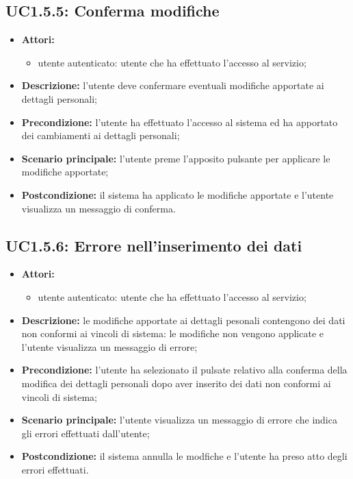 \subsection{UC1.5.5:  Conferma modifiche}
\begin{itemize}
	\item \textbf{Attori:}
	\begin{itemize}
		\item utente autenticato: utente che ha effettuato l'accesso al servizio;
	\end{itemize}
	\item \textbf{Descrizione:} l'utente deve confermare eventuali modifiche apportate ai dettagli personali;
	\item \textbf{Precondizione:} l'utente ha effettuato l'accesso al sistema ed ha apportato dei cambiamenti ai dettagli personali;
	\item \textbf{Scenario principale:} l'utente preme l'apposito pulsante per applicare le modifiche apportate;
	\item \textbf{Postcondizione:} il sistema ha applicato le modifiche apportate e l'utente visualizza un messaggio di conferma.
\end{itemize}

\subsection{UC1.5.6:  Errore nell'inserimento dei dati}
\begin{itemize}
	\item \textbf{Attori:}
	\begin{itemize}
		\item utente autenticato: utente che ha effettuato l'accesso al servizio;
	\end{itemize}
	\item \textbf{Descrizione:} le modifiche apportate ai dettagli pesonali contengono dei dati non conformi ai vincoli di sistema: le modifiche non vengono applicate e l'utente visualizza un messaggio di errore;
	\item \textbf{Precondizione:} l'utente ha selezionato il pulsate relativo alla conferma della modifica dei dettagli personali dopo aver inserito dei dati non conformi ai vincoli di sistema;
	\item \textbf{Scenario principale:} l'utente visualizza un messaggio di errore che indica gli errori effettuati dall'utente;
	\item \textbf{Postcondizione:} il sistema annulla le modfiche e l'utente ha preso atto degli errori effettuati.
\end{itemize}



